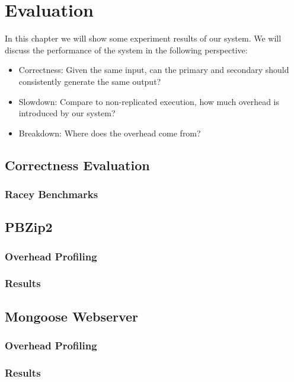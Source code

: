 \chapter{Evaluation}

In this chapter we will show some experiment results of our system. We will discuss the performance of the system in the following perspective:

\begin{itemize}
  \item Correctness: Given the same input, can the primary and secondary should consistently generate the same output?
  \item Slowdown: Compare to non-replicated execution, how much overhead is introduced by our system?
  \item Breakdown: Where does the overhead come from?
\end{itemize}
\section{Correctness Evaluation}
\subsection{Racey Benchmarks}

\section{PBZip2}
\subsection{Overhead Profiling}
\subsection{Results}

\section{Mongoose Webserver}
\subsection{Overhead Profiling}
\subsection{Results}

